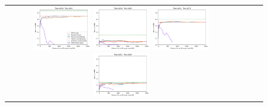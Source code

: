 \begin{figure}[h!]
\begin{tabular}{cccc}

  \includegraphics[width=0.25\textwidth]{Kap7/UNIFIED_train=b234_test=b261_linear_curves.png}  \includegraphics[width=0.25\textwidth]{Kap7/UNIFIED_train=b234_test=b360_linear_curves.png}
  \includegraphics[width=0.25\textwidth]{Kap7/UNIFIED_train=b261_test=b278_linear_curves.png}  \includegraphics[width=0.25\textwidth]{Kap7/UNIFIED_train=b261_test=b360_linear_curves.png} \\


\end{tabular}
\end{figure}
